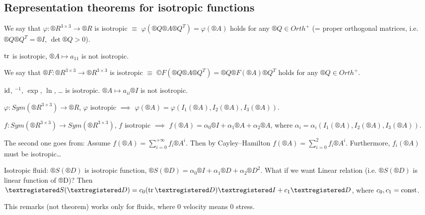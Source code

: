 \documentclass[12pt]{article}					%
\begin{document}
\subsection{Representation theorems for isotropic functions}
\begin{definice}
	We say that $φ: ®R^{3 \times 3} \rightarrow ®R$ is isotropic $≡$ $φ(®Q®A®Q^T) = φ(®A)$ holds for any $®Q \in Orth^+$ (= proper orthogonal matrices, i.e. $®Q®Q^T = ®I$, $\det ®Q > 0$).

	\begin{prikladyin}
		$\operatorname{tr}$ is isotropic, $®A \mapsto a_{11}$ is not isotropic.
	\end{prikladyin}

	We say that $®F: ®R^{3 \times 3} \rightarrow ®R^{3 \times 3}$ is isotropic $≡$ $©F(®Q®A®Q^T) = ®Q®F(®A)®Q^T$ holds for any $®Q \in Orth^+$.

	\begin{prikladyin}
		$\operatorname{id}$, $^{-1}$, $\exp$, $\ln$, … is isotropic. $®A \mapsto a_{ii}®I$ is not isotropic.
	\end{prikladyin}
\end{definice}

\begin{veta}
	$φ: Sym(®R^{3 \times 3}) \rightarrow ®R$, $φ$ isotropic $\implies$ $φ(®A) = φ(I_1(®A), I_2(®A), I_3(®A))$.
	
	$f: Sym(®R^{3 \times 3}) \rightarrow Sym(®R^{3 \times 3})$, $f$ isotropic $\implies$ $f(®A) = α_0 ®I + α_1 ®A + α_2 ®A$, where $α_i = α_i(I_1(®A), I_2(®A), I_3(®A))$.

	\begin{poznamkain}
		The second one goes from: Assume $f(®A) = \sum_{i=0}^{+∞} f_i ®A^i$. Then by Cayley–Hamilton $f(®A) = \sum_{i=0}^{2} f_i ®A^i$. Furthermore, $f_i(®A)$ must be isotropic…
	\end{poznamkain}
\end{veta}

\begin{poznamka}[Continuation of *]
	Isotropic fluid: $®S(®D)$ is isotropic function, $®S(®D) = α_0®I + α_1®D + α_2®D^2$. What if we want Linear relation (i.e. $®S(®D)$ is linear function of ®D)? Then $®S(®D) = c_0(\tr ®D)®I + c_1®D$, where $c_0, c_1 = \operatorname{const}$.
\end{poznamka}

\begin{upozorneni}
	This remarks (not theorem) works only for fluids, where 0 velocity means 0 stress.
\end{upozorneni}
\end{document}
